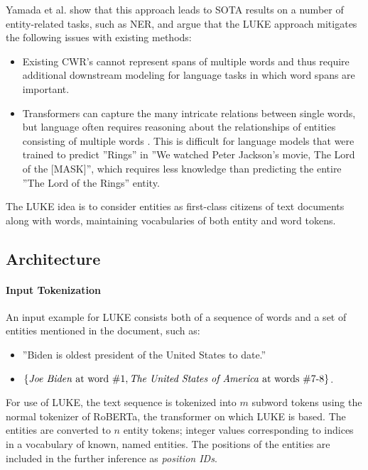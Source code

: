\documentclass[main.tex]{subfiles}
\begin{document}
Yamada et al. show that this approach leads to SOTA results on a number of entity-related tasks, such as NER, and argue that the LUKE approach mitigates the following issues with existing methods:
\begin{itemize}
    \item
        Existing CWR's cannot represent spans of multiple words and thus require additional downstream modeling for language tasks in which word spans are important.
    \item
        Transformers can capture the many intricate relations between single words, but language often requires reasoning about the relationships of entities consisting of multiple words \cite{yamada2020luke}.
        This is difficult for language models that were trained to predict ''Rings'' in ''We watched Peter Jackson's movie, The Lord of the [MASK]'', which requires less knowledge than predicting the entire ''The Lord of the Rings'' entity.
\end{itemize}
The LUKE idea is to consider entities as first-class citizens of text documents along with words, maintaining vocabularies of both entity and word tokens.
\subsection{Architecture}

\paragraph{Input Tokenization}
An input example for LUKE consists both of a sequence of words and a set of entities mentioned in the document, such as:
\begin{itemize}
    \item ''Biden is oldest president of the United States to date.''
    \item $\{\text{\emph{Joe Biden} at word \#1}, \text{\emph{The United States of America} at words \#7-8}\}$.
\end{itemize}
For use of LUKE, the text sequence is tokenized into $m$ subword tokens using the normal tokenizer of RoBERTa, the transformer on which LUKE is based.
The entities are converted to $n$ entity tokens; integer values corresponding to indices in a vocabulary of known, named entities.
The positions of the entities are included in the further inference as \emph{position IDs}.
\end{document}
